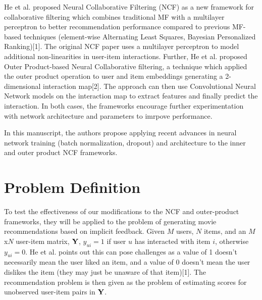 \documentclass{article}
\begin{document}
He et al. proposed Neural Collaborative Filtering (NCF) as a new framework for collaborative filtering which combines traditional MF with a multilayer perceptron to better recommendation performance compared to previous MF-based techniques (element-wise Alternating Least Squares, Bayesian Personalized Ranking)[1]. The original NCF paper uses a multilayer perceptron to model additional non-linearities in user-item interactions. Further, He et al. proposed Outer Product-based Neural Collaborative filtering, a technique which applied the outer product operation to user and item embeddings generating a 2-dimensional interaction map[2]. The approach can then use Convolutional Neural Network models on the interaction map to extract features and finally predict the interaction. In both cases, the frameworks encourage further experimentation with network architecture and parameters to imrpove performance.

In this manuscript, the authors propose applying recent advances in neural network training (batch normalization, dropout) and architecture to the inner and outer product NCF frameworks.


\section{Problem Definition}
\label{sec:Problem Definition}
To test the effectiveness of our modifications to the NCF and outer-product frameworks, they will be applied to the problem of generating movie recommendations based on implicit feedback. Given $M$ users, $N$ items, and an $M$x$N$ user-item matrix, $\bold{Y}$, $y_{ui} = 1$ if user $u$ has interacted with item $i$, otherwise $y_{ui} = 0$. He et al. points out this can pose challenges as a value of 1 doesn't necessarily mean the user liked an item, and a value of 0 doesn't mean the user dislikes the item (they may just be unaware of that item)[1]. The recommendation problem is then given as the problem of estimating scores for unobserved user-item pairs in $\bold{Y}$.
\end{document}
